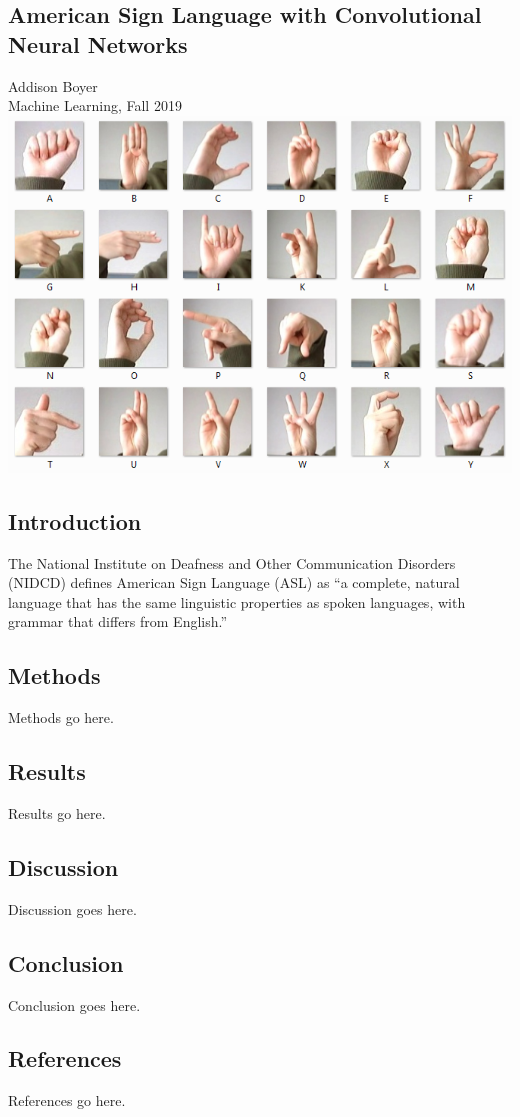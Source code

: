 \documentclass[12pt]{article}
\begin{document}
\begin{center}
\section*{American Sign Language with Convolutional Neural Networks}

Addison Boyer \\
Machine Learning, Fall 2019 \\


\includegraphics[scale=.75]{amer_sign2}
\end{center}

\pagebreak

\begin{multicols}{2}
\subsection*{Introduction}
The National Institute on Deafness and Other Communication Disorders (NIDCD) defines American Sign Language (ASL) as 
\enquote{a complete, natural language that has the same linguistic properties as spoken languages, with grammar that differs from English.}



\subsection*{Methods}

Methods go here.

\subsection*{Results}

Results go here.


\subsection*{Discussion}

Discussion goes here.

\subsection*{Conclusion}

Conclusion goes here.

\end{multicols}

\subsection*{References}

References go here.
\end{document}
